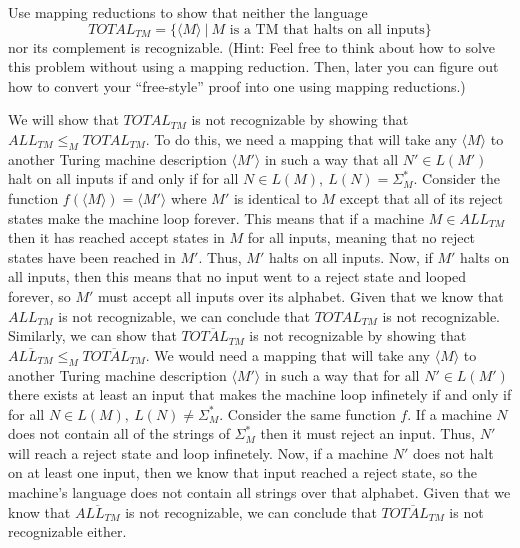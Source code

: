 
Use mapping reductions to show  that neither the language
	\[
	TOTAL_{TM} = \{ \langle M \rangle ~|~ M \mbox{ is a TM that halts on all inputs} \}	
	\]
	nor its complement is recognizable. (Hint: Feel free to think about how to solve this problem
	without using a mapping reduction. Then, later you can figure out how to convert your
	``free-style'' proof into one using mapping reductions.)


\begin{solution}

We will show that $TOTAL_{TM}$ is not recognizable by showing that $ALL_{TM} \le_{M} TOTAL_{TM}$. To do this, we need a mapping that will take any $\langle M \rangle$ to another Turing machine description $\langle M' \rangle$ in such a way that all $N' \in L(M')$ halt on all inputs if and only if for all $N\in L(M), ~ L(N) = \Sigma_M^*$. Consider the function $f(\langle M \rangle) = \langle M' \rangle$ where $M'$ is identical to $M$ except that all of its reject states make the machine loop forever. This means that if a machine $M \in ALL_{TM}$ then it has reached accept states in $M$ for all inputs, meaning that no reject states have been reached in $M'$. Thus, $M'$ halts on all inputs. Now, if $M'$ halts on all inputs, then this means that no input went to a reject state and looped forever, so $M'$ must accept all inputs over its alphabet. Given that we know that $ALL_{TM}$ is not recognizable, we can conclude that $TOTAL_{TM}$ is not recognizable.\\
Similarly, we can show that $\overline{TOTAL_{TM}}$ is not recognizable by showing that $\overline{ALL_{TM}} \le_{M} \overline{TOTAL_{TM}}$. We would need a mapping that will take any $\langle M \rangle$ to another Turing machine description $\langle M' \rangle$ in such a way that for all $N' \in L(M')$ there exists at least an input that makes the machine loop infinetely if and only if for all $N\in L(M), ~ L(N) \ne \Sigma_M^*$. Consider the same function $f$. If a machine $N$ does not contain all of the strings of $\Sigma_M^*$ then it must reject an input. Thus, $N'$ will reach a reject state and loop infinetely. Now, if a machine $N'$ does not halt on at least one input, then we know that input reached a reject state, so the machine's language does not contain all strings over that alphabet. Given that we know that $\overline{ALL_{TM}}$ is not recognizable, we can conclude that $\overline{TOTAL_{TM}}$ is not recognizable either.



\end{solution}
